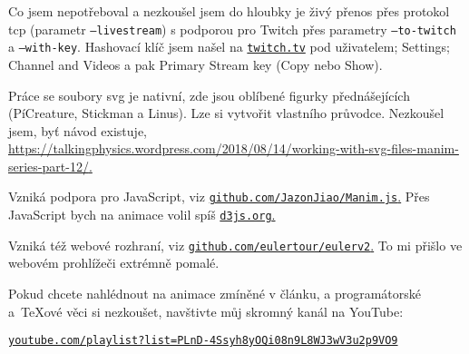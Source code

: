 Co jsem nepotřeboval a nezkoušel jsem do hloubky je živý přenos přes protokol tcp (parametr \texttt{--livestream}) s podporou pro Twitch přes parametry \texttt{--to-twitch} a \texttt{--with-key}. Hashovací klíč jsem našel na \href{https://www.twitch.tv/}{\tt twitch.tv} pod uživatelem; Settings; Channel and Videos a pak Primary Stream key (Copy nebo Show).

Práce se soubory svg je nativní, zde jsou oblíbené figurky přednášejících (PíCreature, Stickman a Linus). Lze si vytvořit vlastního průvodce. Nezkoušel jsem, byť návod existuje, 
\href{https://talkingphysics.wordpress.com/2018/08/14/working-with-svg-files-manim-series-part-12/}{\url{https://talkingphysics.wordpress.com/2018/08/14/working-with-svg-files-manim-series-part-12/}.}%
\smallskip

\maldelka=12.5mm
\noindent
{}\hfill
{}\hfill
{}\hfill
{}%
\smallskip

Vzniká podpora pro JavaScript, viz \href{https://github.com/JazonJiao/Manim.js}{\texttt{github.com/JazonJiao/Manim.js}.} Přes JavaScript bych na animace volil spíš \href{https://d3js.org/}{\texttt{d3js.org}.}

Vzniká též webové rozhraní, viz \href{https://github.com/eulertour/eulerv2}{\texttt{github.com/eulertour/eulerv2}.} To mi přišlo ve webovém prohlížeči extrémně pomalé.%
\medskip

\tecky\smallskip

Pokud chcete nahlédnout na animace zmíněné v článku, a programátorské a~\TeX ové věci si nezkoušet, navštivte můj skromný kanál na YouTube:
\smallskip

\noindent
\hfil\href{https://www.youtube.com/playlist?list=PLnD-4Ssyh8yOQi08n9L8WJ3wV3u2p9VO9}{\texttt{youtube.com/playlist?list=PLnD-4Ssyh8yOQi08n9L8WJ3wV3u2p9VO9}}%
\medskip

\tecky
\medskip

